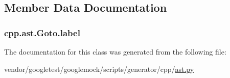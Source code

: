 \subsection{Member Data Documentation}
\subsubsection[{\texorpdfstring{label}{label}}]{\setlength{\rightskip}{0pt plus 5cm}cpp.\+ast.\+Goto.\+label}\hypertarget{classcpp_1_1ast_1_1Goto_a685284ea5f3b21f39aff7f5db841c8f5}{}\label{classcpp_1_1ast_1_1Goto_a685284ea5f3b21f39aff7f5db841c8f5}


The documentation for this class was generated from the following file\+:\begin{DoxyCompactItemize}
\item 
vendor/googletest/googlemock/scripts/generator/cpp/\hyperlink{ast_8py}{ast.\+py}\end{DoxyCompactItemize}
